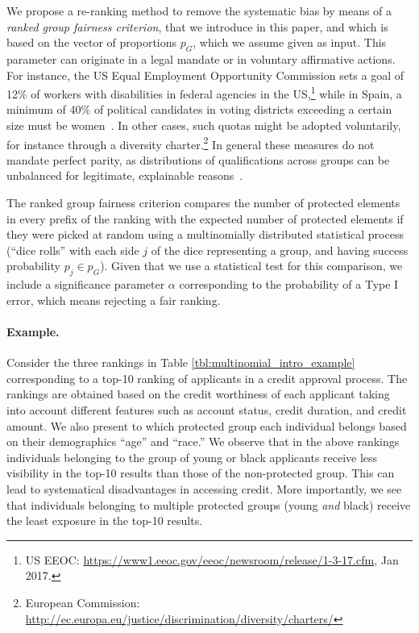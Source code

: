 We propose a re-ranking method to remove the systematic bias by means of a \emph{ranked group fairness criterion}, that we introduce in this paper, and which is based on
the vector of proportions $p_G$, which we assume given as input. This parameter can originate in a legal mandate or in voluntary affirmative actions.
%
For instance, the US Equal Employment Opportunity Commission sets a goal of 12\% of workers with disabilities in federal agencies in the US,\footnote{US EEOC: \url{https://www1.eeoc.gov/eeoc/newsroom/release/1-3-17.cfm}, Jan 2017.}
%
while in Spain, a minimum of 40\% of political candidates in voting districts exceeding a certain size must be women~\cite{verge2010gendering}.
%
In other cases, such quotas might be adopted voluntarily, for instance through a diversity charter.\footnote{European Commission: \url{http://ec.europa.eu/justice/discrimination/diversity/charters/}}
%
In general these measures do not mandate perfect parity, as distributions of qualifications across groups can be unbalanced for legitimate, explainable reasons~\cite{zliobaite2011handling,pedreschi2009integrating}. %
%

The ranked group fairness criterion compares the number of protected elements in every prefix of the ranking with the expected number of protected elements if they were picked at random using a multinomially distributed statistical process (``dice rolls'' with each side $j$ of the dice representing a group, and having success probability $p_j \in p_G$).
%
Given that we use a statistical test for this comparison, we include a significance parameter $\alpha$ corresponding to the probability of a Type I error, which means rejecting a fair ranking.
%

\paragraph{Example.} Consider the three rankings in Table \ref{tbl:multinomial_intro_example} corresponding to a top-10 ranking of applicants in a credit approval process. The rankings are obtained based on the credit worthiness of each applicant taking into account different features such as account status, credit duration, and credit amount.
%
We also present to which protected group each individual belongs based on their demographics ``age'' and ``race.'' We observe that in the above rankings individuals belonging to the group of young or black applicants receive less visibility in the top-10 results than those of the non-protected group. This can lead to systematical disadvantages in accessing credit.
More importantly, we see that individuals belonging to multiple protected groups (young \emph{and } black) receive the least exposure in the top-10 results.

